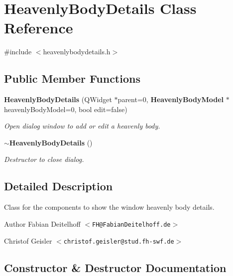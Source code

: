 \section{\-Heavenly\-Body\-Details \-Class \-Reference}
\label{dd/d37/classHeavenlyBodyDetails}


{\ttfamily \#include $<$heavenlybodydetails.\-h$>$}

\subsection*{\-Public \-Member \-Functions}
\begin{DoxyCompactItemize}
\item 
{\bf \-Heavenly\-Body\-Details} (\-Q\-Widget $\ast$parent=0, {\bf \-Heavenly\-Body\-Model} $\ast$heavenly\-Body\-Model=0, bool edit=false)
\begin{DoxyCompactList}\small\item\em \-Open dialog window to add or edit a heavenly body. \end{DoxyCompactList}\item 
{\bf $\sim$\-Heavenly\-Body\-Details} ()\label{dd/d37/classHeavenlyBodyDetails_a7f2566a1ba36b51157a6d0c753a0c545}

\begin{DoxyCompactList}\small\item\em \-Destructor to close dialog. \end{DoxyCompactList}\end{DoxyCompactItemize}


\subsection{\-Detailed \-Description}
\-Class for the components to show the window heavenly body details.

\begin{DoxyAuthor}{\-Author}
\-Fabian \-Deitelhoff $<${\tt \-F\-H@\-Fabian\-Deitelhoff.\-de}$>$ 

\-Christof \-Geisler $<${\tt christof.\-geisler@stud.\-fh-\/swf.\-de}$>$ 
\end{DoxyAuthor}


\subsection{\-Constructor \& \-Destructor \-Documentation}
